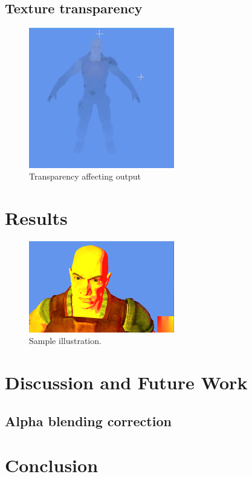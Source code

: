 \documentclass[annual]{acmsiggraph}
\begin{document}
\subsection{Texture transparency}


\begin{figure}
	\centering
	\includegraphics[width=2.5in]{images/transparency}
	\caption{Transparency affecting output}
	\label{fig:transparency}
\end{figure}

\section{Results}
\label{sec:results}

\begin{figure}[ht]
  \centering
  \includegraphics[width=2.5in]{images/test}
  \caption{Sample illustration.}
\end{figure}


\section{Discussion and Future Work}
\label{sec:discussion}

\subsection{Alpha blending correction}


\section{Conclusion}
\label{sec:conclusion}




\end{document}
